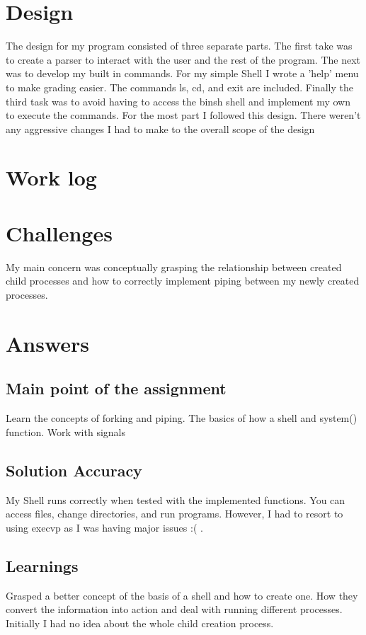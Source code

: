 \documentclass[letterpaper,10pt,titlepage]{article}
\begin{document}
\section{Design}
The design for my program consisted of three separate parts. The first take was to create a parser
to interact with the user and the rest of the program. The next was to develop my built in commands.
For my simple Shell I wrote a 'help' menu to make grading easier. The commands ls, cd, and exit are 
included. Finally the third task was to avoid having to access the binsh shell and implement my own
to execute the commands.
For the most part I followed this design. There weren't any aggressive changes I had to make to the overall
scope of the design
\section{Work log}


\section{Challenges}
My main concern was conceptually grasping the relationship between created child processes 
and how to correctly implement piping between my newly created processes.


\section{Answers}
\subsection{Main point of the assignment}
Learn the concepts of forking and piping. The basics of how a shell and system() function.
Work with signals 

\subsection{Solution Accuracy}
My Shell runs correctly when tested with the implemented functions. You can access files, 
change directories, and run programs. However, I had to resort to using execvp as I was having major issues
:( .


\subsection{Learnings}
Grasped a better concept of the basis of a shell and how to create one. How they convert the information 
into action and deal with running different processes. Initially I had no idea about the whole child creation process.
\end{document}
